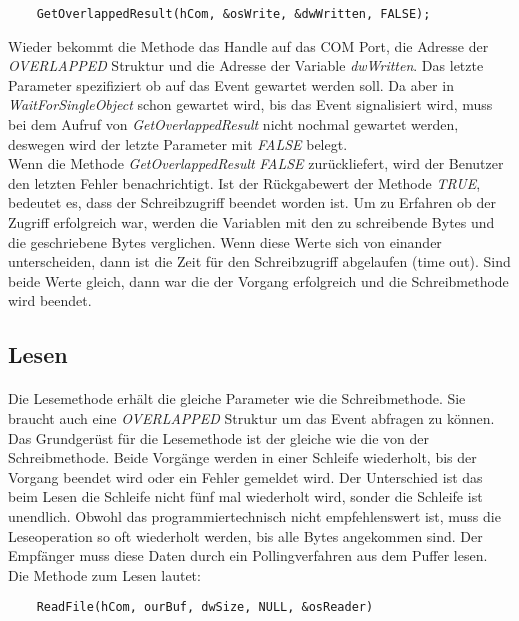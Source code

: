 \begin{lstlisting}
	GetOverlappedResult(hCom, &osWrite, &dwWritten, FALSE);
\end{lstlisting}

Wieder bekommt die Methode das Handle auf das COM Port, die Adresse der \textit{OVERLAPPED} Struktur und die Adresse der Variable \textit{dwWritten}. Das letzte Parameter spezifiziert ob auf das Event gewartet werden soll. Da aber in \textit{WaitForSingleObject} schon gewartet wird, bis das Event signalisiert wird, muss bei dem Aufruf von \textit{GetOverlappedResult} nicht nochmal gewartet werden, deswegen wird der letzte Parameter mit \textit{FALSE} belegt.\\

Wenn die Methode \textit{GetOverlappedResult} \textit{FALSE} zurückliefert, wird der Benutzer den letzten Fehler benachrichtigt. Ist der Rückgabewert der Methode \textit{TRUE}, bedeutet es, dass der Schreibzugriff beendet worden ist. Um zu Erfahren ob der Zugriff erfolgreich war, werden die Variablen mit den zu schreibende Bytes und die geschriebene Bytes verglichen. Wenn diese Werte sich von einander unterscheiden, dann ist die Zeit für den Schreibzugriff abgelaufen (time out). Sind beide Werte gleich, dann war die der Vorgang erfolgreich und die Schreibmethode wird beendet.


\subsection{Lesen}
\paragraph{}
Die Lesemethode erhält die gleiche Parameter wie die Schreibmethode. Sie braucht auch eine \textit{OVERLAPPED} Struktur um das Event abfragen zu können. Das Grundgerüst für die Lesemethode ist der gleiche wie die von der Schreibmethode. Beide Vorgänge werden in einer Schleife wiederholt, bis der Vorgang beendet wird oder ein Fehler gemeldet wird. Der Unterschied ist das beim Lesen die Schleife nicht fünf mal wiederholt wird, sonder die Schleife ist unendlich. Obwohl das programmiertechnisch nicht empfehlenswert ist, muss die Leseoperation so oft wiederholt werden, bis alle Bytes angekommen sind. Der Empfänger muss diese Daten durch ein Pollingverfahren aus dem Puffer lesen. Die Methode zum Lesen lautet:

\begin{lstlisting}
	ReadFile(hCom, ourBuf, dwSize, NULL, &osReader)
\end{lstlisting}

